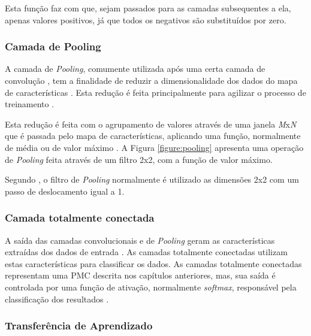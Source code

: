 \par Esta função faz com que, sejam passados para as camadas subsequentes a ela, apenas valores positivos, já que todos os negativos são substituídos por zero. 

\subsubsection{Camada de Pooling}

\par A camada de \textit{Pooling}, comumente utilizada após uma certa camada de convolução \cite{Caroline2016}, tem a finalidade de reduzir a dimensionalidade dos dados do mapa de características \cite{Caroline2016}. Esta redução é feita principalmente para agilizar o processo de treinamento \cite{Caroline2016}.

\par Esta redução é feita com o agrupamento de valores através de uma janela \textit{M}x\textit{N} que é passada pelo mapa de características, aplicando uma função, normalmente de média ou de valor máximo \cite{Amidi2018}. A Figura \ref{figure:pooling} apresenta uma operação de \textit{Pooling} feita através de um filtro 2x2, com a função de valor máximo.


\par Segundo , o filtro de \textit{Pooling} normalmente é utilizado as dimensões 2x2 com um passo de deslocamento igual a 1.

\subsubsection{Camada totalmente conectada}

\par A saída das camadas convolucionais e de \textit{Pooling} geram as características extraídas dos dados de entrada \cite{Carneiro2017}. As camadas totalmente conectadas utilizam estas características para classificar os dados. As camadas totalmente conectadas representam uma PMC \cite{Haykin2001} descrita nos capítulos anteriores, mas, sua saída é controlada por uma função de ativação, normalmente \textit{softmax}, responsável pela classificação dos resultados \cite{Bishop2006}.

\subsubsection{Transferência de Aprendizado}

